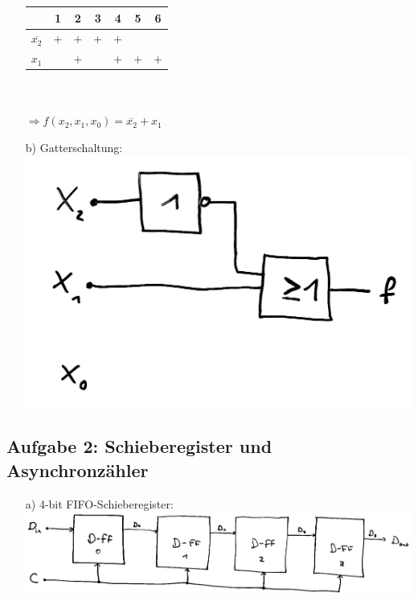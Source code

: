\documentclass{article}
\begin{document}
\begin{enumerate}
\begin{minipage}{0.5\textwidth}
		\end{minipage}
		\begin{minipage}{0.5\textwidth}
			\renewcommand{\arraystretch}{1.2}
			\begin{tabular}{r|cccccc}
				 					& 1 & 2 & 3 & 4 & 5 & 6 \\ \hline
				$\overline{x_2}$	& + & + & + & + &   &   \\
				$x_1$				&   & + &   & + & + & +
			\end{tabular}\\ \vspace*{1cm} \\
			$\Rightarrow f(x_2, x_1, x_0) = \overline{x_2} + x_1$
		\end{minipage}
		\item[b)]
		Gatterschaltung:\\
		\includegraphics[width=0.3\linewidth]{aufgabe1.png}
	\end{enumerate}


	\subsection*{Aufgabe 2: Schieberegister und Asynchronzähler}
	\begin{enumerate}
		\item[a)] 4-bit FIFO-Schieberegister: \\
		\includegraphics[width=\linewidth]{fifo_schieberegister.png}
	\end{enumerate}


	\newpage
\end{document}
